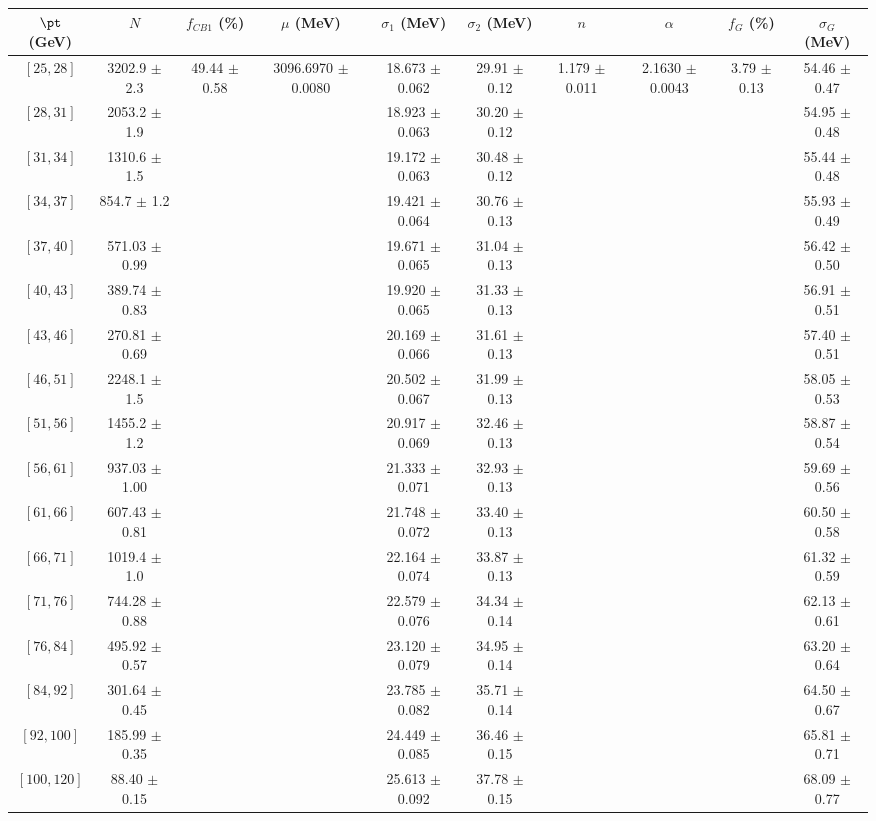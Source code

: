\begin{tabular}{c||c|c|c|c|c|c|c|c|c}
$\pt$ (GeV) & $N$ & $f_{CB1}$ (\%)  & $\mu$ (MeV) & $\sigma_1$ (MeV) & $\sigma_2$ (MeV) & $n$ & $\alpha$ & $f_G$ (\%) & $\sigma_G$ (MeV) \\
\hline
$[25, 28]$ & 3202.9 $\pm$ 2.3 & \multirow{17}{*}{49.44 $\pm$ 0.58} & \multirow{17}{*}{3096.6970 $\pm$ 0.0080} & 18.673 $\pm$ 0.062 & 29.91 $\pm$ 0.12 & \multirow{17}{*}{1.179 $\pm$ 0.011} & \multirow{17}{*}{2.1630 $\pm$ 0.0043} & \multirow{17}{*}{3.79 $\pm$ 0.13} & 54.46 $\pm$ 0.47\\
$[28, 31]$ & 2053.2 $\pm$ 1.9 &  &  & 18.923 $\pm$ 0.063 & 30.20 $\pm$ 0.12 &  &  &  & 54.95 $\pm$ 0.48\\
$[31, 34]$ & 1310.6 $\pm$ 1.5 &  &  & 19.172 $\pm$ 0.063 & 30.48 $\pm$ 0.12 &  &  &  & 55.44 $\pm$ 0.48\\
$[34, 37]$ & 854.7 $\pm$ 1.2 &  &  & 19.421 $\pm$ 0.064 & 30.76 $\pm$ 0.13 &  &  &  & 55.93 $\pm$ 0.49\\
$[37, 40]$ & 571.03 $\pm$ 0.99 &  &  & 19.671 $\pm$ 0.065 & 31.04 $\pm$ 0.13 &  &  &  & 56.42 $\pm$ 0.50\\
$[40, 43]$ & 389.74 $\pm$ 0.83 &  &  & 19.920 $\pm$ 0.065 & 31.33 $\pm$ 0.13 &  &  &  & 56.91 $\pm$ 0.51\\
$[43, 46]$ & 270.81 $\pm$ 0.69 &  &  & 20.169 $\pm$ 0.066 & 31.61 $\pm$ 0.13 &  &  &  & 57.40 $\pm$ 0.51\\
$[46, 51]$ & 2248.1 $\pm$ 1.5 &  &  & 20.502 $\pm$ 0.067 & 31.99 $\pm$ 0.13 &  &  &  & 58.05 $\pm$ 0.53\\
$[51, 56]$ & 1455.2 $\pm$ 1.2 &  &  & 20.917 $\pm$ 0.069 & 32.46 $\pm$ 0.13 &  &  &  & 58.87 $\pm$ 0.54\\
$[56, 61]$ & 937.03 $\pm$ 1.00 &  &  & 21.333 $\pm$ 0.071 & 32.93 $\pm$ 0.13 &  &  &  & 59.69 $\pm$ 0.56\\
$[61, 66]$ & 607.43 $\pm$ 0.81 &  &  & 21.748 $\pm$ 0.072 & 33.40 $\pm$ 0.13 &  &  &  & 60.50 $\pm$ 0.58\\
$[66, 71]$ & 1019.4 $\pm$ 1.0 &  &  & 22.164 $\pm$ 0.074 & 33.87 $\pm$ 0.13 &  &  &  & 61.32 $\pm$ 0.59\\
$[71, 76]$ & 744.28 $\pm$ 0.88 &  &  & 22.579 $\pm$ 0.076 & 34.34 $\pm$ 0.14 &  &  &  & 62.13 $\pm$ 0.61\\
$[76, 84]$ & 495.92 $\pm$ 0.57 &  &  & 23.120 $\pm$ 0.079 & 34.95 $\pm$ 0.14 &  &  &  & 63.20 $\pm$ 0.64\\
$[84, 92]$ & 301.64 $\pm$ 0.45 &  &  & 23.785 $\pm$ 0.082 & 35.71 $\pm$ 0.14 &  &  &  & 64.50 $\pm$ 0.67\\
$[92, 100]$ & 185.99 $\pm$ 0.35 &  &  & 24.449 $\pm$ 0.085 & 36.46 $\pm$ 0.15 &  &  &  & 65.81 $\pm$ 0.71\\
$[100, 120]$ & 88.40 $\pm$ 0.15 &  &  & 25.613 $\pm$ 0.092 & 37.78 $\pm$ 0.15 &  &  &  & 68.09 $\pm$ 0.77\\
\end{tabular}
